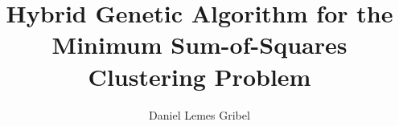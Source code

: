 \documentclass[
  msc
]{ThesisPUC}
\author{Daniel Lemes Gribel}
\title{Hybrid Genetic Algorithm for the Minimum Sum-of-Squares Clustering Problem}
\begin{document}
  
  
  
  
  
  \arial
  
  \normalfont
  
\end{document}
